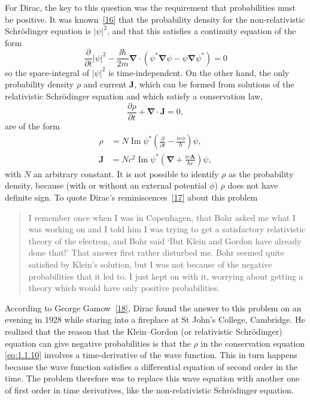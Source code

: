 For Dirac, the key to this question was the requirement that probabilities
must be positive. It was known~\hyperref[ref:1.16]{[16]} that the probability density for the non-relativistic Schr\"odinger equation is $|\psi|^2$, and that this satisfies a continuity
equation of the form
\begin{equation*}
  \frac{\partial}{\partial t}|\psi|^2
  -\frac{\ii\hbar}{2m}\boldsymbol{\nabla}\cdot
  (\psi^*\boldsymbol{\nabla}\psi-\psi\boldsymbol{\nabla}\psi^*)=0
\end{equation*}
so the space-integral of $|\psi|^2$ is time-independent. On the other hand,
the only probability density $\rho$ and current $\mathbf{J}$, which can be formed from
solutions of the relativistic Schr\"odinger equation and which satisfy a
conservation law,
\begin{equation}
  \frac{\partial\rho}{\partial t}+\boldsymbol{\nabla}\cdot\mathbf{J}=0,
  \tag{1.1.10}\label{eq:1.1.10}
\end{equation}
are of the form
\begin{align}
  \rho&=N\operatorname{Im}\psi^*
  \left(\frac{\partial}{\partial t}-\frac{ie\phi}{\hbar}\right)\psi,
  \tag{1.1.11}\label{eq:1.1.11}\\
  \mathbf{J}&=Nc^2\operatorname{Im}\psi^*
  \left(\boldsymbol{\nabla}+\frac{ie\mathbf{A}}{\hbar c}\right)\psi,
  \tag{1.1.12}\label{eq:1.1.12}
\end{align}
with $N$ an arbitrary constant. It is not possible to identify $\rho$ as the
probability density, because (with or without an external potential $\phi$) $\rho$
does not have definite sign. To quote Dirac's reminiscences~\hyperref[ref:1.17]{[17]} about this
problem
\begin{quote}
I remember once when I was in Copenhagen, that Bohr
asked me what I was working on and I told him I was trying
to get a satisfactory relativistic theory of the electron, and Bohr
said `But Klein and Gordon have already done that!' That
answer first rather disturbed me. Bohr seemed quite satisfied
by Klein's solution, but I was not because of the negative
probabilities that it led to. I just kept on with it, worrying about
getting a theory which would have only positive probabilities.
\end{quote}

According to George Gamow~\hyperref[ref:1.18]{[18]}, Dirac found the answer to this problem
on an evening in 1928 while staring into a fireplace at St John's College,
Cambridge. He realized that the reason that the Klein--Gordon (or
relativistic Schr\"odinger) equation can give negative probabilities is that
the $\rho$ in the conservation equation \eqref{eq:1.1.10} involves a time-derivative of the
wave function. This in turn happens because the wave function satisfies
a differential equation of second order in the time. The problem therefore
was to replace this wave equation with another one of first order in time
derivatives, like the non-relativistic Schr\"odinger equation.

